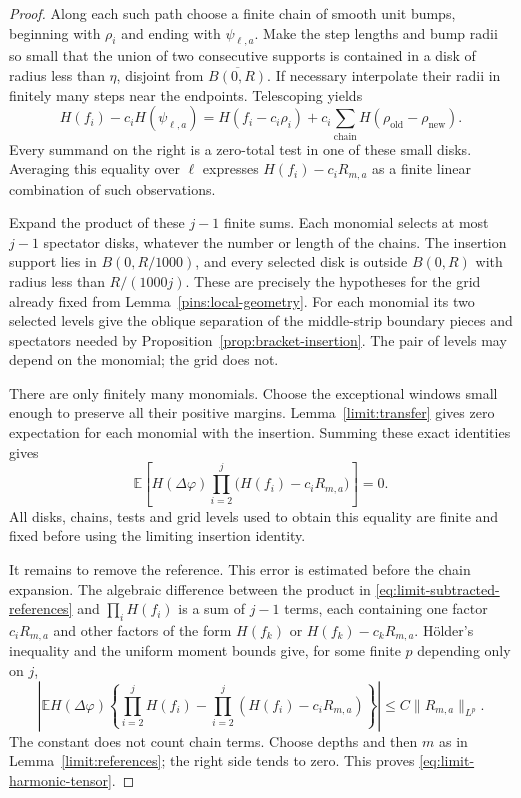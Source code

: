 \documentclass[11pt]{article}
\newcommand{\E}{\mathbb E}
\theoremstyle{definition}
\theoremstyle{remark}
\numberwithin{equation}{section}
\begin{document}
\begin{proof}
Along each such path choose a finite chain of smooth unit bumps,
beginning with \(\rho_i\) and ending with \(\psi_{\ell,a}\).
Make the step lengths and bump radii so small that the union of
two consecutive supports is contained in a disk of radius less
than \(\eta\), disjoint from \(\overline{B(0,R)}\).
If necessary interpolate their radii in finitely many steps near
the endpoints.  Telescoping yields
\[
 H(f_i)-c_iH(\psi_{\ell,a})
  =H(f_i-c_i\rho_i)
    +c_i\sum_{\text{chain}}H(\rho_{\mathrm{old}}-\rho_{\mathrm{new}}).
\]
Every summand on the right is a zero-total test in one of these
small disks.  Averaging this equality over \(\ell\) expresses
\(H(f_i)-c_iR_{m,a}\) as a finite linear combination of such
observations.

Expand the product of these \(j-1\) finite sums.  Each monomial
selects at most \(j-1\) spectator disks, whatever the number or
length of the chains.  The insertion support lies in
\(B(0,R/1000)\), and every selected disk is outside \(B(0,R)\)
with radius less than \(R/(1000j)\).  These are precisely the
hypotheses for the grid already fixed from
Lemma~\ref{pins:local-geometry}.  For each monomial its two selected
levels give the oblique separation of the middle-strip boundary
pieces and spectators needed by Proposition~\ref{prop:bracket-insertion}.
The pair of levels may depend on the monomial; the grid does not.

There are only finitely many monomials.  Choose the exceptional windows
small enough to preserve all their positive margins.
Lemma~\ref{limit:transfer} gives zero expectation for each monomial
with the insertion.  Summing these exact identities gives
\begin{equation}
 \E\left[H(\Delta\varphi)
              \prod_{i=2}^j\bigl(H(f_i)-c_iR_{m,a}\bigr)\right]=0.
 \label{eq:limit-subtracted-references}
\end{equation}
All disks, chains, tests and grid levels used to obtain this equality
are finite and fixed before using the limiting insertion identity.

It remains to remove the reference.  This error is estimated before
the chain expansion.  The algebraic difference between the product
in \eqref{eq:limit-subtracted-references} and \(\prod_iH(f_i)\)
is a sum of \(j-1\) terms, each containing one factor \(c_iR_{m,a}\)
and other factors of the form \(H(f_k)\) or
\(H(f_k)-c_kR_{m,a}\).  H\"older's inequality and the uniform
moment bounds give, for some finite \(p\) depending only on \(j\),
\[
 \left|\E H(\Delta\varphi)
       \left\{\prod_{i=2}^jH(f_i)
        -\prod_{i=2}^j(H(f_i)-c_iR_{m,a})\right\}\right|
       \le C\|R_{m,a}\|_{L^p}.
\]
The constant does not count chain terms.  Choose depths and then
\(m\) as in Lemma~\ref{limit:references}; the right side tends to
zero.  This proves \eqref{eq:limit-harmonic-tensor}.


\end{proof}
\end{document}
